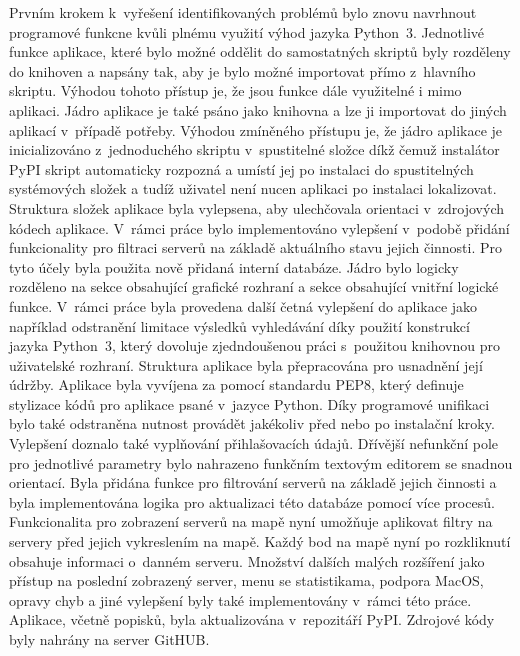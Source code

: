 \documentclass[%
  12pt,       				%
  a4paper,    				%
	unicode,						%
]{report}				    	%
\begin{document}
Prvním krokem k~vyřešení identifikovaných problémů bylo znovu navrhnout programové funkcne kvůli plnému využití výhod jazyka Python~3. Jednotlivé funkce aplikace, které bylo možné oddělit do samostatných skriptů byly rozděleny do knihoven a napsány tak, aby je bylo možné importovat přímo z~hlavního skriptu. Výhodou tohoto přístup je, že jsou funkce dále využitelné i mimo aplikaci. Jádro aplikace je také psáno jako knihovna a lze ji importovat do jiných aplikací v~případě potřeby. Výhodou zmíněného přístupu je, že jádro aplikace je inicializováno z~jednoduchého skriptu v~spustitelné složce díkž čemuž instalátor PyPI skript automaticky rozpozná a umístí jej po instalaci do spustitelných systémových složek a tudíž uživatel není nucen aplikaci po instalaci lokalizovat. Struktura složek aplikace byla vylepsena, aby ulechčovala orientaci v~zdrojových kódech aplikace. V~rámci práce bylo implementováno vylepšení v~podobě přidání funkcionality pro filtraci serverů na základě aktuálního stavu jejich činnosti. Pro tyto účely byla použita nově přidaná interní databáze. Jádro bylo logicky rozděleno na sekce obsahující grafické rozhraní a sekce obsahující vnitřní logické funkce. V~rámci práce byla provedena další četná vylepšení do aplikace jako například odstranění limitace výsledků vyhledávání díky použití konstrukcí jazyka Python~3, který dovoluje zjedndoušenou práci s~použitou knihovnou pro uživatelské rozhraní. Struktura aplikace byla přepracována pro usnadnění její údržby. Aplikace byla vyvíjena za pomocí standardu PEP8, který definuje stylizace kódů pro aplikace psané v~jazyce Python. Díky programové unifikaci bylo také odstraněna nutnost provádět jakékoliv před nebo po instalační kroky. Vylepšení doznalo také vyplňování přihlašovacích údajů. Dřívější nefunkční pole pro jednotlivé parametry bylo nahrazeno funkčním textovým editorem se snadnou orientací. Byla přidána funkce pro filtrování serverů na základě jejich činnosti a byla implementována logika pro aktualizaci této databáze pomocí více procesů. Funkcionalita pro zobrazení serverů na mapě nyní umožňuje aplikovat filtry na servery před jejich vykreslením na mapě. Každý bod na mapě nyní po rozkliknutí obsahuje informaci o~danném serveru. Množství dalších malých rozšíření jako přístup na poslední zobrazený server, menu se statistikama, podpora MacOS, opravy chyb a jiné vylepšení byly také implementovány v~rámci této práce. Aplikace, včetně popisků, byla aktualizována v~repozitáří PyPI. Zdrojové kódy byly nahrány na server GitHUB.\\
\end{document}
